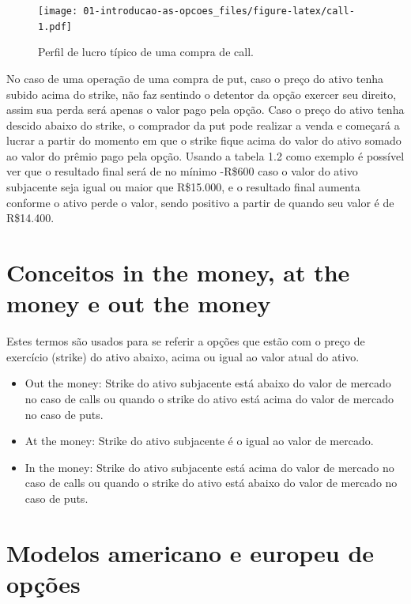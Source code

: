 \documentclass[]{book}
\providecommand{\tightlist}{%
  \setlength{\itemsep}{0pt}\setlength{\parskip}{0pt}}
\begin{document}
\begin{figure}
\centering
\texttt{[image: 01-introducao-as-opcoes\_files/figure-latex/call-1.pdf]}
\caption{\label{fig:call}Perfil de lucro típico de uma compra de call.}
\end{figure}

No caso de uma operação de uma compra de put, caso o preço do ativo
tenha subido acima do strike, não faz sentindo o detentor da opção
exercer seu direito, assim sua perda será apenas o valor pago pela
opção. Caso o preço do ativo tenha descido abaixo do strike, o comprador
da put pode realizar a venda e começará a lucrar a partir do momento em
que o strike fique acima do valor do ativo somado ao valor do prêmio
pago pela opção. Usando a tabela 1.2 como exemplo é possível ver que o
resultado final será de no mínimo -R\$600 caso o valor do ativo
subjacente seja igual ou maior que R\$15.000, e o resultado final
aumenta conforme o ativo perde o valor, sendo positivo a partir de
quando seu valor é de R\$14.400.

\section{Conceitos in the money, at the money e out the
money}\label{conceitos-in-the-money-at-the-money-e-out-the-money}

Estes termos são usados para se referir a opções que estão com o preço
de exercício (strike) do ativo abaixo, acima ou igual ao valor atual do
ativo.

\begin{itemize}
\tightlist
\item
  Out the money: Strike do ativo subjacente está abaixo do valor de
  mercado no caso de calls ou quando o strike do ativo está acima do
  valor de mercado no caso de puts.\\
\item
  At the money: Strike do ativo subjacente é o igual ao valor de
  mercado.
\item
  In the money: Strike do ativo subjacente está acima do valor de
  mercado no caso de calls ou quando o strike do ativo está abaixo do
  valor de mercado no caso de puts.
\end{itemize}

\section{Modelos americano e europeu de
opções}\label{modelos-americano-e-europeu-de-opcoes}
\end{document}
